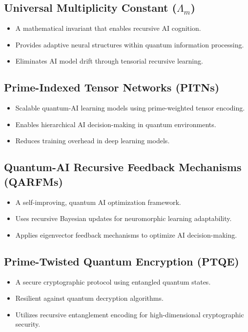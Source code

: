 \documentclass{article}
\theoremstyle{plain}
\begin{document}
\subsection{Universal Multiplicity Constant ($\Lambda_m$)}
\begin{itemize}
    \item A mathematical invariant that enables recursive AI cognition.
    \item Provides adaptive neural structures within quantum information processing.
    \item Eliminates AI model drift through tensorial recursive learning.
\end{itemize}

\subsection{Prime-Indexed Tensor Networks (PITNs)}
\begin{itemize}
    \item Scalable quantum-AI learning models using prime-weighted tensor encoding.
    \item Enables hierarchical AI decision-making in quantum environments.
    \item Reduces training overhead in deep learning models.
\end{itemize}

\subsection{Quantum-AI Recursive Feedback Mechanisms (QARFMs)}
\begin{itemize}
    \item A self-improving, quantum AI optimization framework.
    \item Uses recursive Bayesian updates for neuromorphic learning adaptability.
    \item Applies eigenvector feedback mechanisms to optimize AI decision-making.
\end{itemize}

\subsection{Prime-Twisted Quantum Encryption (PTQE)}
\begin{itemize}
    \item A secure cryptographic protocol using entangled quantum states.
    \item Resilient against quantum decryption algorithms.
    \item Utilizes recursive entanglement encoding for high-dimensional cryptographic security.
\end{itemize}
\end{document}
